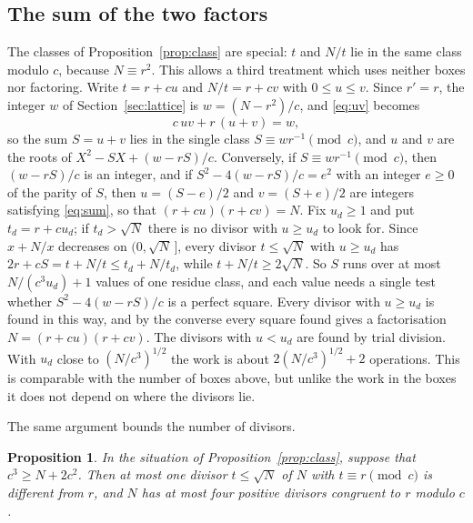 \documentclass[screen,reqno]{aomart}
\numberwithin{equation}{section}
\theoremstyle{plain}
\newtheorem{proposition}[theorem]{Proposition}
\theoremstyle{definition}
\theoremstyle{remark}
\begin{document}
\subsection{The sum of the two factors}\label{sec:sum}
The classes of Proposition~\ref{prop:class} are special: $t$ and $N/t$
lie in the same class modulo $c$, because $N\equiv r^2$. This allows a
third treatment which uses neither boxes nor factoring. Write $t=r+cu$
and $N/t=r+cv$ with $0\le u\le v$. Since $r'=r$, the integer $w$ of Section~\ref{sec:lattice} is $w=(N-r^2)/c$, and \eqref{eq:uv} becomes
\begin{equation}\label{eq:sum}
  c\,uv+r\,(u+v)=w ,
\end{equation}
so the sum $S=u+v$ lies in the single class $S\equiv wr^{-1}\pmod c$,
and $u$ and $v$ are the roots of $X^2-SX+(w-rS)/c$. Conversely, if
$S\equiv wr^{-1}\pmod c$, then $(w-rS)/c$ is an integer, and if
$S^2-4(w-rS)/c=e^2$ with an integer $e\ge0$ of the parity of $S$, then
$u=(S-e)/2$ and $v=(S+e)/2$ are integers satisfying \eqref{eq:sum}, so
that $(r+cu)(r+cv)=N$. Fix $u_d\ge1$ and put $t_d=r+cu_d$; if
$t_d>\sqrt N$ there is no divisor with $u\ge u_d$ to look for. Since
$x+N/x$ decreases on $(0,\sqrt N\,]$, every divisor $t\le\sqrt N$ with
$u\ge u_d$ has $2r+cS=t+N/t\le t_d+N/t_d$, while $t+N/t\ge2\sqrt N$.
So $S$ runs over at most $N/(c^3u_d)+1$ values of one residue class,
and each value needs a single test whether $S^2-4(w-rS)/c$ is a
perfect square. Every divisor with $u\ge u_d$ is found in this way,
and by the converse every square found gives a factorisation
$N=(r+cu)(r+cv)$. The divisors with $u<u_d$ are found by trial division. With $u_d$ close to $(N/c^3)^{1/2}$ the work
is about $2(N/c^3)^{1/2}+2$ operations. This is comparable with the
number of boxes above, but unlike the work in the boxes it does not
depend on where the divisors lie.

The same argument bounds the number of divisors.

\begin{proposition}\label{prop:fourdiv}
In the situation of Proposition~\ref{prop:class}, suppose that
$c^3\ge N+2c^2$. Then at most one divisor $t\le\sqrt N$ of $N$ with
$t\equiv r\pmod c$ is different from $r$, and $N$ has at most four
positive divisors congruent to $r$ modulo $c$.
\end{proposition}
\end{document}
